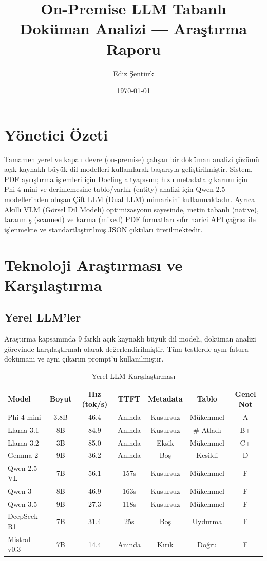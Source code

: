 \documentclass[11pt,a4paper]{article}
\title{On-Premise LLM Tabanlı Doküman Analizi — Araştırma Raporu}
\author{Ediz Şentürk}
\date{\today}
\begin{document}
\shorthandoff{=!:}

\maketitle
\tableofcontents
\newpage

\section{Yönetici Özeti}
Tamamen yerel ve kapalı devre (on-premise) çalışan bir doküman analizi çözümü açık kaynaklı büyük dil modelleri kullanılarak başarıyla geliştirilmiştir. Sistem, PDF ayrıştırma işlemleri için Docling altyapısını; hızlı metadata çıkarımı için Phi-4-mini ve derinlemesine tablo/varlık (entity) analizi için Qwen 2.5 modellerinden oluşan Çift LLM (Dual LLM) mimarisini kullanmaktadır. Ayrıca Akıllı VLM (Görsel Dil Modeli) optimizasyonu sayesinde, metin tabanlı (native), taranmış (scanned) ve karma (mixed) PDF formatları sıfır harici API çağrısı ile işlenmekte ve standartlaştırılmış JSON çıktıları üretilmektedir.

\section{Teknoloji Araştırması ve Karşılaştırma}

\subsection{Yerel LLM'ler}
Araştırma kapsamında 9 farklı açık kaynaklı büyük dil modeli, doküman analizi görevinde karşılaştırmalı olarak değerlendirilmiştir. Tüm testlerde aynı fatura dokümanı ve aynı çıkarım prompt'u kullanılmıştır.

\begin{table}[H]
\centering
\caption{Yerel LLM Karşılaştırması}
\begin{tabular}{lcccccc}
\toprule
Model & Boyut & Hız (tok/s) & TTFT & Metadata & Tablo & Genel Not \\
\midrule
Phi-4-mini & 3.8B & 46.4 & Anında & Kusursuz & Mükemmel & A \\
Llama 3.1 & 8B & 84.9 & Anında & Kusursuz & \# Atladı & B+ \\
Llama 3.2 & 3B & 85.0 & Anında & Eksik & Mükemmel & C+ \\
Gemma 2 & 9B & 36.2 & Anında & Boş & Kesildi & D \\
Qwen 2.5-VL & 7B & 56.1 & 157s & Kusursuz & Mükemmel & F \\
Qwen 3 & 8B & 46.9 & 163s & Kusursuz & Mükemmel & F \\
Qwen 3.5 & 9B & 27.3 & 118s & Kusursuz & Mükemmel & F \\
DeepSeek R1 & 7B & 31.4 & 25s & Boş & Uydurma & F \\
Mistral v0.3 & 7B & 14.4 & Anında & Kırık & Doğru & F \\
\bottomrule
\end{tabular}
\end{table}
\end{document}
